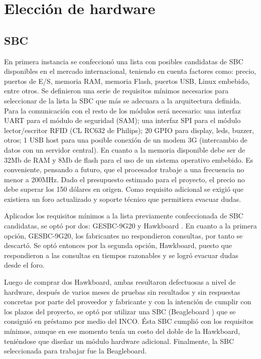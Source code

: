 \bigskip


\section{Elecci\'on de hardware}

\subsection{SBC}
En primera instancia se confeccionó una lista con posibles candidatas de SBC disponibles
en el mercado internacional, teniendo en cuenta factores como: precio, puertos de E/S, memoria RAM, memoria Flash, puertos USB, Linux embebido, entre otros.
Se definieron una serie de requisitos mínimos necesarios para seleccionar de la lista la SBC que más se adecuara a la arquitectura definida.
Para la comunicación con el resto de los módulos será necesario: una interfaz UART para el módulo de seguridad (SAM); una interfaz SPI para el módulo lector/escritor RFID (CL RC632 de Philips); 20 GPIO para display, leds, buzzer, otros; 1 USB host para una posible conexión de un modem 3G (intercambio de datos con un servidor central). En cuanto a la memoria disponible debe ser de 32Mb de RAM y 8Mb de flash para el uso de un sistema operativo embebido. Es conveniente, pensando a futuro, que el procesador trabaje a una frecuencia no menor a 200MHz.
Dado el presupuesto estimado para el proyecto, el precio no debe superar los 150 dólares en origen.
Como requisito adicional se exigió que existiera un foro actualizado y soporte técnico que permitiera evacuar dudas.


Aplicados los requisitos mínimos a la lista previamente confeccionada de SBC candidatas, se optó por dos: GESBC-9G20 \cite{9G20} y Hawkboard \cite{Hawk}.
En cuanto a la primera opción, GESBC-9G20, los fabricantes no respondieron consultas, por tanto se descartó. Se optó entonces por la segunda opción, Hawkboard, puesto que respondieron a las consultas en tiempos razonables y se logró evacuar dudas desde el foro.


Luego de comprar dos Hawkboard, ambas resultaron defectuosas a nivel de hardware, después de varios meses de pruebas sin resultados y sin respuestas concretas por parte del proveedor y fabricante y con la intención de cumplir con los plazos del proyecto, se optó por utilizar una SBC (Beagleboard \cite{Beagle}) que se consiguió en préstamo por medio del INCO. Ésta SBC cumplió con los requisitos mínimos, aunque en ese momento tenía un costo del doble de la Hawkboard, teniéndose que diseñar un módulo hardware adicional.
Finalmente, la SBC seleccionada para trabajar fue la Beagleboard.

